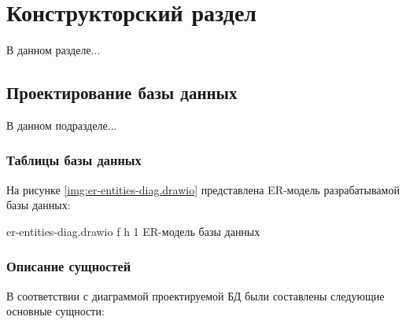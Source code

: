 \chapter{Конструкторский раздел}

В данном разделе...

\section{Проектирование базы данных}

В данном подразделе...

\subsection{Таблицы базы данных}

На рисунке \ref{img:er-entities-diag.drawio} представлена ER-модель разрабатывамой базы данных:

{er-entities-diag.drawio} %
{f} %
{h} %
{1\textwidth} %
{ER-модель базы данных} %

\subsection{Описание сущностей}

В соответствии с диаграммой проектируемой БД были составлены следующие основные сущности:

